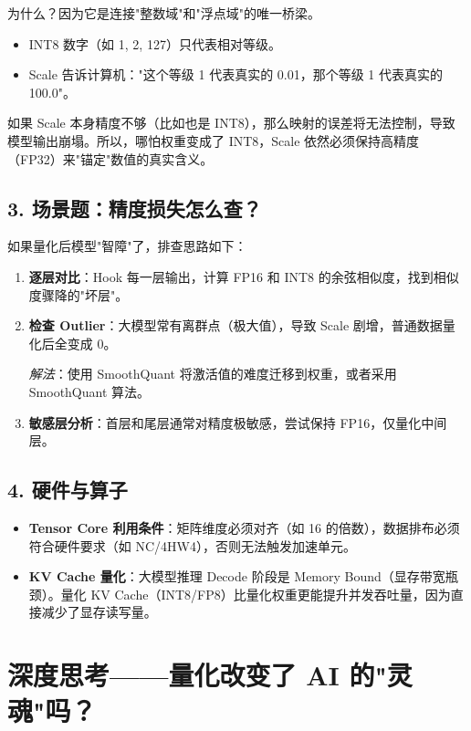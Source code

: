 \documentclass[fontset=fandol,11pt,a4paper]{ctexart}
\newcommand{\keyword}[1]{\textbf{\color{Primary}#1}}
\begin{document}
为什么？因为它是连接"整数域"和"浮点域"的唯一桥梁。

\begin{itemize}
  \item INT8 数字（如 1, 2, 127）只代表相对等级。
  \item Scale 告诉计算机："这个等级 1 代表真实的 0.01，那个等级 1 代表真实的 100.0"。
\end{itemize}

如果 Scale 本身精度不够（比如也是 INT8），那么映射的误差将无法控制，导致模型输出崩塌。所以，哪怕权重变成了 INT8，Scale 依然必须保持高精度（FP32）来"锚定"数值的真实含义。

\subsection{3. 场景题：精度损失怎么查？}

如果量化后模型"智障"了，排查思路如下：

\begin{enumerate}
  \item \keyword{逐层对比}：Hook 每一层输出，计算 FP16 和 INT8 的余弦相似度，找到相似度骤降的"坏层"。
  \item \keyword{检查 Outlier}：大模型常有离群点（极大值），导致 Scale 剧增，普通数据量化后全变成 0。
  
  \textit{解法}：使用 SmoothQuant 将激活值的难度迁移到权重，或者采用 SmoothQuant 算法。
  
  \item \keyword{敏感层分析}：首层和尾层通常对精度极敏感，尝试保持 FP16，仅量化中间层。
\end{enumerate}

\subsection{4. 硬件与算子}

\begin{itemize}
  \item \keyword{Tensor Core 利用条件}：矩阵维度必须对齐（如 16 的倍数），数据排布必须符合硬件要求（如 NC/4HW4），否则无法触发加速单元。
  \item \keyword{KV Cache 量化}：大模型推理 Decode 阶段是 Memory Bound（显存带宽瓶颈）。量化 KV Cache（INT8/FP8）比量化权重更能提升并发吞吐量，因为直接减少了显存读写量。
\end{itemize}

\section{深度思考——量化改变了 AI 的"灵魂"吗？}
\end{document}

